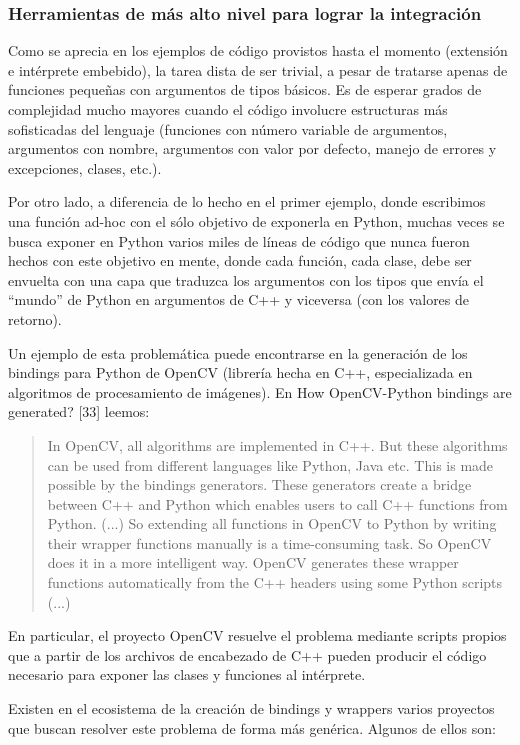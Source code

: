 \documentclass[]{article}
\begin{document}
\subsubsection{Herramientas de más alto nivel para lograr la integración}

Como se aprecia en los ejemplos de código provistos hasta el momento (extensión
e intérprete embebido), la tarea dista de ser trivial, a pesar de tratarse
apenas de funciones pequeñas con argumentos de tipos básicos. Es de esperar
grados de complejidad mucho mayores cuando el código involucre estructuras más
sofisticadas del lenguaje (funciones con número variable de argumentos,
argumentos con nombre, argumentos con valor por defecto, manejo de errores y
excepciones, clases, etc.).

Por otro lado, a diferencia de lo hecho en el primer ejemplo, donde escribimos
una función ad-hoc con el sólo objetivo de exponerla en Python, muchas veces se
busca exponer en Python varios miles de líneas de código que nunca fueron
hechos con este objetivo en mente, donde cada función, cada clase, debe ser
envuelta con una capa que traduzca los argumentos con los tipos que envía el
``mundo'' de Python en argumentos de C++ y viceversa (con los valores de
retorno).

Un ejemplo de esta problemática puede encontrarse en la generación de los
bindings para Python de OpenCV (librería hecha en C++, especializada en
algoritmos de procesamiento de imágenes). En How OpenCV-Python bindings are
generated? [33] leemos:

\begin{quotation}
In OpenCV, all algorithms are implemented in C++. But these algorithms can be
used from different languages like Python, Java etc. This is made possible by
the bindings generators. These generators create a bridge between C++ and
Python which enables users to call C++ functions from Python. (...)  So
extending all functions in OpenCV to Python by writing their wrapper functions
manually is a time-consuming task. So OpenCV does it in a more intelligent way.
OpenCV generates these wrapper functions automatically from the C++ headers
using some Python scripts (...)
\end{quotation}

En particular, el proyecto OpenCV resuelve el problema mediante scripts propios
que a partir de los archivos de encabezado de C++ pueden producir el código
necesario para exponer las clases y funciones al intérprete. 

Existen en el ecosistema de la creación de bindings y wrappers varios proyectos
que buscan resolver este problema de forma más genérica. Algunos de ellos son:
\end{document}
